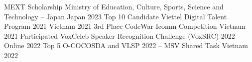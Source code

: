 


\begin{cvhonors}

  \cvhonor
    {MEXT Scholarship} %
    {Ministry of Education, Culture, Sports, Science and Technology -- Japan} %
    {Japan} %
    {2023} %
  \cvhonor
    {Top 10 Candidate} %
    {Viettel Digital Talent Program 2021} %
    {Vietnam} %
    {2021} %
  \cvhonor
    {3rd Place} %
    {CodeWar-Icomm Competition} %
    {Vietnam} %
    {2021} %
  \cvhonor
    {Participated} %
    {VoxCeleb Speaker Recognition Challenge (VoxSRC) 2022} %
    {Online} %
    {2022} %
  \cvhonor
    {Top 5} %
    {O-COCOSDA and VLSP 2022 -- MSV Shared Task} %
    {Vietnam} %
    {2022} %
\end{cvhonors}